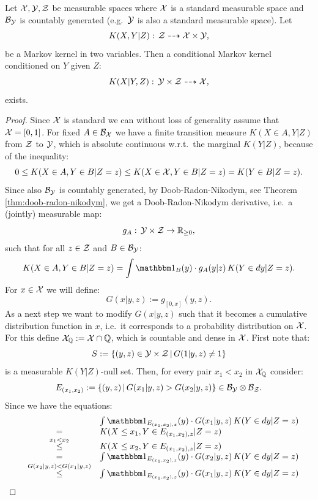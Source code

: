 \begin{Thm}
    \label{reg-cond-trans-kernel-existence-I}
    Let $\mathcal{X}, \mathcal{Y}, \mathcal{Z}$ be measurable spaces where $\mathcal{X}$ is a standard measurable space and $\mathcal{B}_{\mathcal{Y}}$ is countably generated (e.g.\ $\mathcal{Y}$ is also a standard measurable space).
Let 
\[ K(X,Y|Z): \, \mathcal{Z} \dashrightarrow  \mathcal{X} \times \mathcal{Y},\]
be a Markov kernel in two variables. 
Then a conditional Markov kernel
conditioned on $Y$ given $Z$:
\[ K(X|Y,Z): \, \mathcal{Y} \times \mathcal{Z} \dashrightarrow  \mathcal{X},\]
exists.
\begin{proof}
    Since $\mathcal{X}$ is standard we can without loss of generality assume that $\mathcal{X}=[0,1]$.
    For fixed $A \in \mathcal{B}_{\mathcal{X}}$
    we have a finite transition measure $ K(X\in A, Y|Z)$ from $\mathcal{Z}$ to $\mathcal{Y}$, which is 
    absolute continuous w.r.t.\ the marginal $ K(Y|Z)$, because of the inequality:
    \[ 0 \le  K(X\in A, Y \in B |Z=z) \le K(X\in \mathcal{X}, Y \in B |Z=z) = K(Y \in B |Z=z).   \]
    Since also $\mathcal{B}_{\mathcal{Y}}$ is countably generated, by Doob-Radon-Nikodym, see Theorem \ref{thm:doob-radon-nikodym},
    we get a Doob-Radon-Nikodym derivative, i.e.\ a (jointly) measurable map:
    \[g_A:\, \mathcal{Y} \times \mathcal{Z} \to \mathbb{R}_{\ge 0},\]
    such that for all $z \in \mathcal{Z}$ and $B \in \mathcal{B}_{\mathcal{Y}}$:
    \[  K(X \in A, Y \in B|Z=z) = \int \I_B(y) \cdot g_A(y|z)\,  K(Y \in dy|Z=z).\]
    For $x \in \mathcal{X}$ we will define:
    \[ G(x|y,z) := g_{[0,x]}(y,z).\] 
As a next step we want to modify  $G(x|y,z)$ such that it becomes a cumulative distribution function in $x$, i.e.\ it corresponds to a probability distribution on $\mathcal{X}$. 
For this define $\mathcal{X}_{\mathbb{Q}}:= \mathcal{X} \cap \mathbb{Q}$, which is countable and dense in $\mathcal{X}$.
First note that:
\[ S:=\left \{ (y,z) \in \mathcal{Y} \times \mathcal{Z} \,|\, G(1|y,z) \neq 1 \right \}  \]
is a measurable $ K(Y|Z)$-null set.
Then, for every pair $x_1<x_2$ in $\mathcal{X}_{\mathbb{Q}}$ consider:
\[ E_{(x_1,x_2)} := \{ (y,z) \,|\, G(x_1|y,z) > G(x_2|y,z) \} \in \mathcal{B}_{\mathcal{Y}} \otimes \mathcal{B}_{\mathcal{Z}}. \]
Since we have the equations:
\[ \begin{array}{rcl}
 &&\int \I_{E_{(x_1,x_2),z}}(y) \cdot G(x_1|y,z) \,  K(Y \in dy|Z=z) \\
&=&  K(X \le x_1, Y \in E_{(x_1,x_2),z} |Z=z) \\
&\stackrel{x_1 < x_2}{\le}&  K(X \le x_2, Y \in E_{(x_1,x_2),z} |Z=z)  \\
&=& \int \I_{E_{(x_1,x_2),z}}(y) \cdot G(x_2|y,z) \,  K(Y \in dy|Z=z) \\
&\stackrel{G(x_2|y,z) < G(x_1|y,z)}{\le} & \int \I_{E_{(x_1,x_2),z}}(y) \cdot G(x_1|y,z) \,  K(Y \in dy|Z=z)

\end{array}\]
\end{proof}
\end{Thm}
